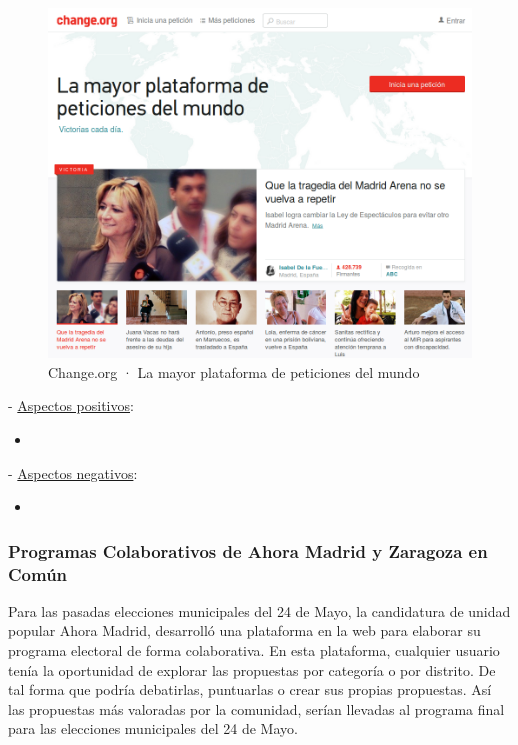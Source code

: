 \begin{figure}[H]
\centering
\includegraphics[keepaspectratio, scale=0.30]{Media/Captures/changeOrg.png}
\caption{Change.org · La mayor plataforma de peticiones del mundo}
\label{fig:changeOrg}
\end{figure}

 - \underline{Aspectos positivos}:

\begin{itemize}
	\item 
\end{itemize}

 - \underline{Aspectos negativos}:

\begin{itemize}
	\item 
\end{itemize}

\subsubsection{Programas Colaborativos de Ahora Madrid y Zaragoza en Común}

Para las pasadas elecciones municipales del 24 de Mayo, la candidatura de unidad popular Ahora Madrid, desarrolló una plataforma en la web para elaborar su programa electoral de forma colaborativa. En esta plataforma, cualquier usuario tenía la oportunidad de explorar las propuestas por categoría o por distrito. De tal forma que podría debatirlas, puntuarlas o crear sus propias propuestas. Así las propuestas más valoradas por la comunidad, serían llevadas al programa final para las elecciones municipales del 24 de Mayo.

